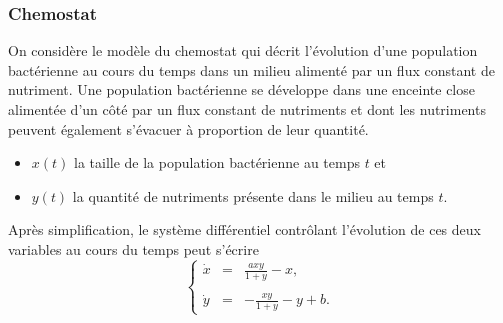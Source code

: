 \subsubsection{Chemostat }


On considère le modèle du chemostat qui décrit l'évolution d'une population bactérienne au cours du temps dans un milieu alimenté par un flux constant de nutriment. Une population bactérienne se développe dans une enceinte close alimentée d'un côté par un flux constant de nutriments et dont les nutriments peuvent également s'évacuer à proportion de leur quantité.
\begin{itemize}
  \item $x(t)$ la taille de la population bactérienne au temps $t$ et
  \item $y(t)$ la quantité de nutriments présente dans le milieu au temps $t$.
\end{itemize}
Après simplification, le système différentiel contrôlant l'évolution de ces deux variables au cours du temps peut s'écrire
$$
\left\{\begin{array}{rcl} 
        \dot x & = & \displaystyle{\frac{a x y}{1 + y} - x}, \\
        \\
        \dot y & = & \displaystyle{- \frac{x y}{1 + y} - y + b}. 
       \end{array}
\right.
$$

